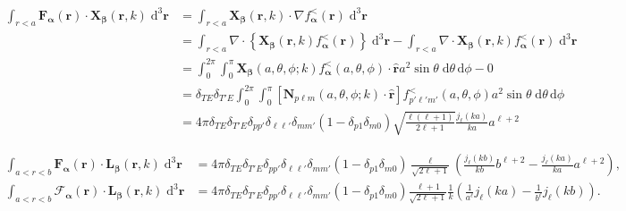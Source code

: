 \documentclass{article}
\begin{document}
\begin{equation}
\begin{split}
\int_{r<a}\mathbf{F}_{\bm{\alpha}}(\mathbf{r})\cdot\mathbf{X}_{\bm{\beta}}(\mathbf{r},k)\;\mathrm{d}^3\mathbf{r} &= \int_{r < a}\mathbf{X}_{\bm{\beta}}(\mathbf{r},k)\cdot\nabla f_{\bm{\alpha}}^<(\mathbf{r})\;\mathrm{d}^3\mathbf{r}\\
&= \int_{r < a}\nabla\cdot\left\{\mathbf{X}_{\bm{\beta}}(\mathbf{r},k) f_{\bm{\alpha}}^<(\mathbf{r})\right\}\;\mathrm{d}^3\mathbf{r} - \int_{r < a}\nabla\cdot\mathbf{X}_{\bm{\beta}}(\mathbf{r},k)f_{\bm{\alpha}}^<(\mathbf{r})\;\mathrm{d}^3\mathbf{r}\\
&= \int_0^{2\pi}\int_0^\pi\mathbf{X}_{\bm{\beta}}(a,\theta,\phi;k)f_{\bm{\alpha}}^<(a,\theta,\phi)\cdot \hat{\mathbf{r}}a^2\sin\theta\;\mathrm{d}\theta\,\mathrm{d}\phi - 0\\
&= \delta_{TE}\delta_{T'E}\int_0^{2\pi}\int_0^\pi\left[\mathbf{N}_{p\ell m}(a,\theta,\phi;k)\cdot\hat{\mathbf{r}}\right]f_{p'\ell' m'}^<(a,\theta,\phi)a^2\sin\theta\;\mathrm{d}\theta\,\mathrm{d}\phi\\
&= 4\pi\delta_{TE}\delta_{T'E}\delta_{pp'}\delta_{\ell\ell'}\delta_{mm'}(1 - \delta_{p1}\delta_{m0})\sqrt{\frac{\ell(\ell + 1)}{2\ell + 1}}\frac{j_\ell(ka)}{ka}a^{\ell+2}
\end{split}
\end{equation}

\begin{equation}
\begin{split}
\int_{a<r<b}\mathbf{F}_{\bm{\alpha}}(\mathbf{r})\cdot\mathbf{L}_{\bm{\beta}}(\mathbf{r},k)\;\mathrm{d}^3\mathbf{r} &= 4\pi\delta_{TE}\delta_{T'E}\delta_{pp'}\delta_{\ell\ell'}\delta_{mm'}(1 - \delta_{p1}\delta_{m0})\frac{\ell}{\sqrt{2\ell+1}}\left(\frac{j_\ell(kb)}{kb}b^{\ell+2} - \frac{j_\ell(ka)}{ka}a^{\ell+2}\right),\\
\int_{a<r<b}\bm{\mathcal{F}}_{\bm{\alpha}}(\mathbf{r})\cdot\mathbf{L}_{\bm{\beta}}(\mathbf{r},k)\;\mathrm{d}^3\mathbf{r} &= 4\pi\delta_{TE}\delta_{T'E}\delta_{pp'}\delta_{\ell\ell'}\delta_{mm'}(1 - \delta_{p1}\delta_{m0})\frac{\ell+1}{\sqrt{2\ell+1}}\frac{1}{k}\left(\frac{1}{a^\ell}j_\ell(ka) - \frac{1}{b^\ell}j_\ell(kb)\right).
\end{split}
\end{equation}
\end{document}
